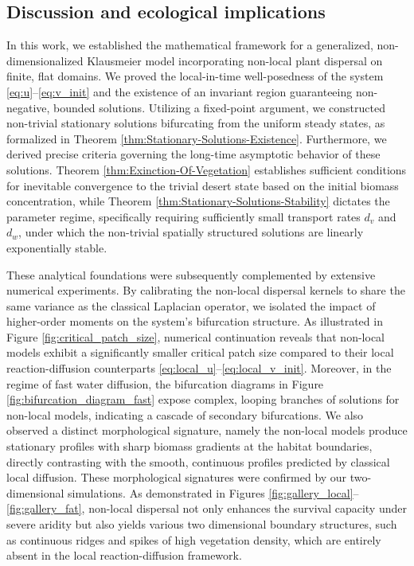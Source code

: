 \documentclass[11pt, a4paper]{article}
\theoremstyle{break}
\theoremstyle{break}
\theoremstyle{break}
\theoremstyle{break}
\theoremstyle{break}
\theoremstyle{break}
\theoremstyle{break}
\theoremstyle{break}
\theoremstyle{break}
\theoremstyle{break}
\begin{document}
\subsection{Discussion and ecological implications}

In this work, we established the mathematical framework for a generalized, non-dimensionalized Klausmeier model incorporating non-local plant dispersal on finite, flat domains. We proved the local-in-time well-posedness of the system \eqref{eq:u}--\eqref{eq:v_init} and the existence of an invariant region guaranteeing non-negative, bounded solutions. Utilizing a fixed-point argument, we constructed non-trivial stationary solutions bifurcating from the uniform steady states, as formalized in Theorem \ref{thm:Stationary-Solutions-Existence}. Furthermore, we derived precise criteria governing the long-time asymptotic behavior of these solutions. Theorem \ref{thm:Exinction-Of-Vegetation} establishes sufficient conditions for inevitable convergence to the trivial desert state based on the initial biomass concentration, while Theorem \ref{thm:Stationary-Solutions-Stability} dictates the parameter regime, specifically requiring sufficiently small transport rates $d_v$ and $d_w$, under which the non-trivial spatially structured solutions are linearly exponentially stable.

These analytical foundations were subsequently complemented by extensive numerical experiments. By calibrating the non-local dispersal kernels to share the same variance as the classical Laplacian operator, we isolated the impact of higher-order moments on the system's bifurcation structure. As illustrated in Figure \ref{fig:critical_patch_size}, numerical continuation reveals that non-local models exhibit a significantly smaller critical patch size compared to their local reaction-diffusion counterparts \eqref{eq:local_u}--\eqref{eq:local_v_init}. Moreover, in the regime of fast water diffusion, the bifurcation diagrams in Figure \ref{fig:bifurcation_diagram_fast} expose complex, looping branches of solutions for non-local models, indicating a cascade of secondary bifurcations. We also observed a distinct morphological signature, namely the non-local models produce stationary profiles with sharp biomass gradients at the habitat boundaries, directly contrasting with the smooth, continuous profiles predicted by classical local diffusion. These morphological signatures were confirmed by our two-dimensional simulations. As demonstrated in Figures \ref{fig:gallery_local}--\ref{fig:gallery_fat}, non-local dispersal not only enhances the survival capacity under severe aridity but also yields various two dimensional boundary structures, such as continuous ridges and spikes of high vegetation density, which are entirely absent in the local reaction-diffusion framework.
\end{document}
